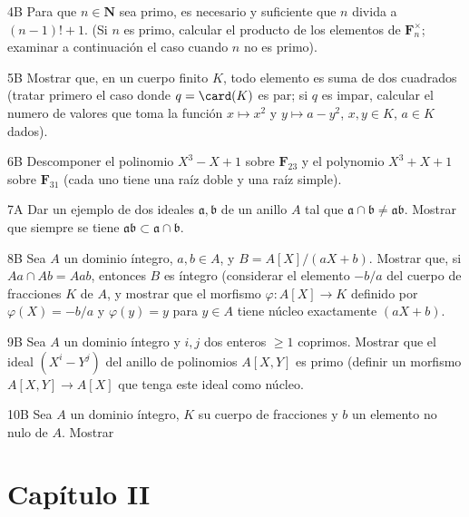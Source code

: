 \documentclass[bibtotoc,leqno,spanish]{amsbook}
\newcommand{\NN}{\mathbf{N}}
\newcommand{\FF}{\mathbf{F}}
\newcommand{\idl}[1]{\mathfrak{#1}}
\renewcommand{\to}[1][]{\xrightarrow{#1}}
\numberwithin{equation}{section}
\theoremstyle{note}
\newcommand{\exername}{}
\newtheorem*{namedexer}{\exername}
\newenvironment{exer*}[1]{\renewcommand{\exername}{#1}\begin{namedexer}}{\end{namedexer}}
\theoremstyle{note}
\theoremstyle{rem}
\numberwithin{theorem}{section}
\numberwithin{proposition}{section}
\numberwithin{definition}{section}
\numberwithin{lemma}{section}
\numberwithin{corollary}{section}
\numberwithin{example}{section}
\numberwithin{footnote}{section}%
\begin{document}
\begin{exer*}{4B}
Para que $n\in\NN$ sea primo, es necesario y suficiente que $n$ divida a
$(n-1)!+1$. (Si $n$ es primo, calcular el producto de los elementos de $\FF_n^\times$;
examinar a continuaci\'on el caso cuando $n$ no es primo).
\end{exer*}

\begin{exer*}{5B}
Mostrar que, en un cuerpo finito $K$, todo elemento es suma de dos cuadrados (tratar
primero el caso donde $q = \card(K)$ es par; si $q$ es impar, calcular el numero de valores
que toma la funci\'on $x\mapsto x^2$ y $y\mapsto a-y^2$, $x, y\in K$, $a\in K$ dados).
\end{exer*}

\begin{exer*}{6B}
Descomponer el polinomio $X^3-X+1$ sobre $\FF_{23}$ y el polynomio $X^3+X+1$ sobre
$\FF_{31}$ (cada uno tiene una ra\'iz doble y una ra\'iz simple).
\end{exer*}

\begin{exer*}{7A}
Dar un ejemplo de dos ideales $\idl{a}, \idl{b}$ de un anillo $A$ tal que
$\idl{a}\cap\idl{b}\neq\idl{a}\idl{b}$. Mostrar que siempre se tiene
$\idl{a}\idl{b}\subset\idl{a}\cap\idl{b}$.
\end{exer*}

\begin{exer*}{8B}
Sea $A$ un dominio \'integro, $a, b\in A$, y $B = A[X]/(aX+b)$.
Mostrar que, si $Aa\cap Ab=Aab$, entonces $B$ es \'integro (considerar
el elemento $-b/a$ del cuerpo de fracciones $K$ de $A$, y mostrar que el
morfismo $\varphi : A[X]\to K$ definido por $\varphi(X) = -b/a$ y $\varphi(y) = y$
para $y\in A$ tiene n\'ucleo exactamente $(aX+b)$.
\end{exer*}

\begin{exer*}{9B}
Sea $A$ un dominio \'integro y $i, j$ dos enteros $\geq 1$ coprimos. Mostrar que el
ideal $(X^i-Y^j)$ del anillo de polinomios $A[X,Y]$ es primo (definir un morfismo
$A[X,Y]\to A[X]$ que tenga este ideal como n\'ucleo.
\end{exer*}

\begin{exer*}{10B}
Sea $A$ un dominio \'integro, $K$ su cuerpo de fracciones y $b$ un elemento no nulo
de $A$. Mostrar
\end{exer*}

\section*{Cap\'itulo II}
\end{document}
